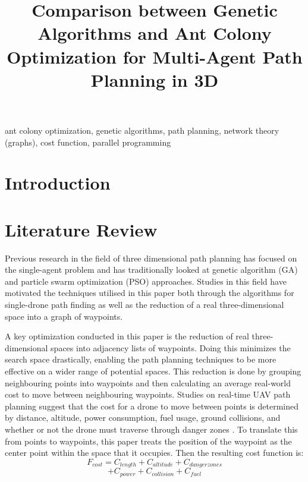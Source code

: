 \documentclass[conference]{IEEEtran}
\begin{document}
\title{Comparison between Genetic Algorithms and Ant Colony Optimization for Multi-Agent Path Planning in 3D}

\author{
\and
{}
\and
{}
\and
{}
\and
{}
\and
{}
}

\maketitle

\begin{abstract}
\blindtext
\end{abstract}

\begin{IEEEkeywords}
ant colony optimization, genetic algorithms, path planning, network theory (graphs), cost function, parallel programming
\end{IEEEkeywords}

\section{Introduction}
\blindtext

\section{Literature Review}
Previous research in the field of three dimensional path planning has focused on the single-agent problem and has traditionally looked at genetic algorithm (GA) and particle swarm optimization (PSO) approaches. Studies in this field have motivated the techniques utilised in this paper both through the algorithms for single-drone path finding as well as the reduction of a real three-dimensional space into a graph of waypoints.

A key optimization conducted in this paper is the reduction of real three-dimensional spaces into adjacency lists of waypoints. Doing this minimizes the search space drastically, enabling the path planning techniques to be more effective on a wider range of potential spaces. This reduction is done by grouping neighbouring points into waypoints and then calculating an average real-world cost to move between neighbouring waypoints. Studies on real-time UAV path planning suggest that the cost for a drone to move between points is determined by distance, altitude, power consumption, fuel usage, ground collisions, and whether or not the drone must traverse through danger zones \cite{b1}. To translate this from points to waypoints, this paper treats the position of the waypoint as the center point within the space that it occupies. Then the resulting cost function is:
$$F_{cost} = C_{length} + C_{altitude} + C_{danger zones}$$
$$ + C_{power} + C_{collision} + C_{fuel}$$
\end{document}
